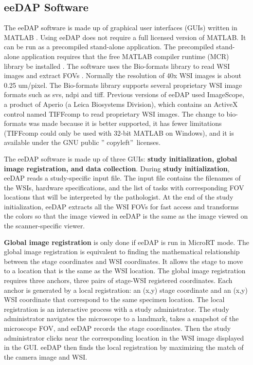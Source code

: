 \documentclass{article}%
\begin{document}
\subsection{eeDAP Software}

\label{eedap-software}

The eeDAP software is made up of graphical user interfaces (GUIs) written in
MATLAB \cite{MatlabRuntime2016}. Using eeDAP does not require a full licensed
version of MATLAB. It can be run as a precompiled stand-alone application. The
precompiled stand-alone application requires that the free MATLAB compiler
runtime (MCR) library be installed \cite{MatlabRuntime2016}. The software uses
the Bio-formats library to read WSI images and extract FOVs
\cite{BioFormats2016}. Normally the resolution of 40x WSI images is about 0.25
um/pixel. The Bio-formats library supports several proprietary WSI image
formats such as svs, ndpi and tiff. Previous versions of eeDAP used
ImageScope, a product of Aperio (a Leica Biosystems Division), which contains
an ActiveX control named TIFFcomp to read proprietary WSI images. The change
to bio-formats was made because it is better supported, it has fewer
limitations (TIFFcomp could only be used with 32-bit MATLAB on Windows), and
it is available under the GNU public \textquotedblright
copyleft\textquotedblright\ licenses.

The eeDAP software is made up of three GUIs: \textbf{study initialization,
global image registration, and data collection}. During \textbf{study
initialization}, eeDAP reads a study-specific input file. The input file
contains the filenames of the WSIs, hardware specifications, and the list of
tasks with corresponding FOV locations that will be interpreted by the
pathologist. At the end of the study initialization, eeDAP extracts all the
WSI FOVs for fast access and transforms the colors so that the image viewed in
eeDAP is the same as the image viewed on the scanner-specific viewer.

\textbf{Global image registration} is only done if eeDAP is run in MicroRT
mode. The global image registration is equivalent to finding the mathematical
relationship between the stage coordinates and WSI coordinates. It allows the
stage to move to a location that is the same as the WSI location. The global
image registration requires three anchors, three pairs of stage-WSI registered
coordinates. Each anchor is generated by a local registration: an (x,y) stage
coordinate and an (x,y) WSI coordinate that correspond to the same specimen
location. The local registration is an interactive process with a study
administrator. The study administrator navigates the microscope to a landmark,
takes a snapshot of the microscope FOV, and eeDAP records the stage
coordinates. Then the study administrator clicks near the corresponding
location in the WSI image displayed in the GUI. eeDAP then finds the local
registration by maximizing the match of the camera image and WSI.
\end{document}
